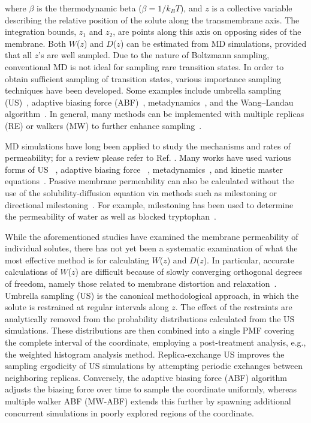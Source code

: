 where $\beta$ is the thermodynamic beta ($\beta=1/k_{B}T$), and $z$ is a collective variable describing the relative position of the solute along the transmembrane axis. The integration bounds, $z_1$ and $z_2$, are points along this axis on opposing sides of the membrane.
Both $W$($z$) and $D$($z$) can be estimated from MD simulations, provided that all $z$'s are well sampled.
Due to the nature of Boltzmann sampling, conventional MD is not ideal for sampling rare transition states. In order to obtain sufficient sampling of transition states, various importance sampling techniques have been developed. Some examples include umbrella sampling (US)~\cite{Torrie1977}, adaptive biasing force (ABF)~\cite{Rodriguez-Gomez2004,Darve2001,Darve2008a,Wei2011}, metadynamics~\cite{Laio2002}, and the Wang--Landau algorithm~\cite{Wang2001}. In general, many methods can be implemented with multiple replicas (RE) or walkers (MW) to further enhance sampling~\cite{Swendsen1986a}.
\par MD simulations have long been applied to study the mechanisms and rates of permeability; for a review please refer to Ref. . Many works have used various forms of US ~\cite{Wilson1996,Grossfield2002,Ulander2003a,Bemporad2004,MacCallum2007,Johansson2008,MacCallum2008,Bauer2011,Tejwani2011,MacCallum2011,Paloncyova2012,Swift2013,Riahi2014,Carpenter2014,Issack2015}, adaptive biasing force ~\cite{Bemporad2005,Comer2014a}, metadynamics~\cite{Ghaemi2012}, and kinetic master equations~\cite{Parisio2013}. Passive membrane permeability can also be calculated without the use of the solubility-diffusion equation via methods such as milestoning or directional milestoning~\cite{Kirmizialtin2011,Vanden-Eijnden2008,Majek2010,Bello-Rivas2015}. For example, milestoning has been used to determine the permeability of water as well as blocked tryptophan~\cite{Cardenas2012,Cardenas2014}.

\par While the aforementioned studies have examined the membrane permeability of individual solutes, there has not yet been a systematic examination of what the most effective method is for calculating $W$($z$) and $D$($z$). In particular, accurate calculations of $W$($z$) are difficult because of slowly converging orthogonal degrees of freedom, namely those related to membrane distortion and relaxation~\cite{Neale2011,Neale2014}. Umbrella sampling (US) is the canonical methodological approach, in which the solute is restrained at regular intervals along $z$. The effect of the restraints are analytically removed from the probability distributions calculated from the US simulations. These distributions are then combined into a single PMF covering the complete interval of the coordinate, employing a post-treatment analysis, e.g., the weighted histogram analysis method.  Replica-exchange US improves the sampling ergodicity of US simulations by attempting periodic exchanges between neighboring replicas. Conversely, the adaptive biasing force (ABF) algorithm adjusts the biasing force over time to sample the coordinate uniformly, whereas multiple walker ABF (MW-ABF) extends this further by spawning additional concurrent simulations in poorly explored regions of the coordinate.

